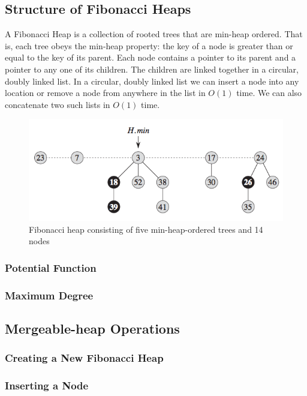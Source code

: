 \documentclass[12pt]{article}
\begin{document}
\subsection{Structure of Fibonacci Heaps}
A Fibonacci Heap is a collection of rooted trees that are min-heap ordered. That is, each tree obeys the min-heap property: the key of a node is greater than or equal to the key of its parent. Each node contains a pointer to its parent and a pointer to any one of its children. The children are linked together in a circular, doubly linked list. In a circular, doubly linked list we can insert a node into any location or remove a node from anywhere in the list in $O(1)$ time. We can also concatenate two such lists in $O(1)$ time.
\begin{figure} [H]
    \begin{center}
        \includegraphics[width=\textwidth]{Images/Hmin.png}
        \caption{Fibonacci heap consisting of five min-heap-ordered trees and 14 nodes}
        \label{fig:H.min}
    \end{center}
\end{figure}



\subsubsection{Potential Function}
\subsubsection{Maximum Degree}

\subsection{Mergeable-heap Operations}
\subsubsection{Creating a New Fibonacci Heap}
\subsubsection{Inserting a Node}
\end{document}
